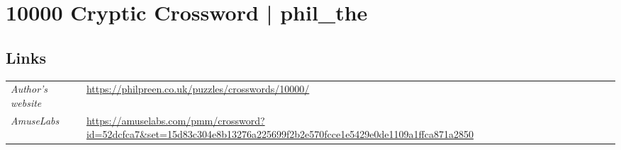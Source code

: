 \section{10000 Cryptic Crossword | {\normalfont phil\_the}}
\label{sec:16-10000-cryptic-crossword-phil-the}

\subsection*{Links}
\begin{tabularx}{\textwidth}{l X}
\emph{Author's website} & \url{https://philpreen.co.uk/puzzles/crosswords/10000/} \\
\emph{AmuseLabs} & \url{https://amuselabs.com/pmm/crossword?id=52dcfca7&set=15d83c304e8b13276a225699f2b2e570fcce1e5429e0de1109a1ffca871a2850} \\
\end{tabularx}
\pagebreak
